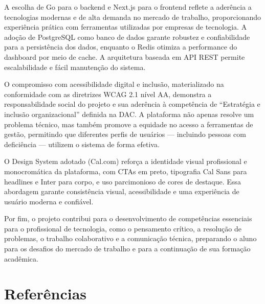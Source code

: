 \documentclass[a4paper,12pt,oneside]{article}
\begin{document}
A escolha de Go para o backend e Next.js para o frontend reflete a aderência a tecnologias modernas e de alta demanda no mercado de trabalho, proporcionando experiência prática com ferramentas utilizadas por empresas de tecnologia. A adoção de PostgreSQL como banco de dados garante robustez e confiabilidade para a persistência dos dados, enquanto o Redis otimiza a performance do dashboard por meio de cache. A arquitetura baseada em API REST permite escalabilidade e fácil manutenção do sistema.

O compromisso com acessibilidade digital e inclusão, materializado na conformidade com as diretrizes WCAG 2.1 nível AA, demonstra a responsabilidade social do projeto e sua aderência à competência de ``Estratégia e inclusão organizacional'' definida na DAC. A plataforma não apenas resolve um problema técnico, mas também promove a equidade no acesso a ferramentas de gestão, permitindo que diferentes perfis de usuários --- incluindo pessoas com deficiência --- utilizem o sistema de forma efetiva.

O Design System adotado (Cal.com) reforça a identidade visual profissional e monocromática da plataforma, com CTAs em preto, tipografia Cal Sans para headlines e Inter para corpo, e uso parcimonioso de cores de destaque. Essa abordagem garante consistência visual, acessibilidade e uma experiência de usuário moderna e confiável.

Por fim, o projeto contribui para o desenvolvimento de competências essenciais para o profissional de tecnologia, como o pensamento crítico, a resolução de problemas, o trabalho colaborativo e a comunicação técnica, preparando o aluno para os desafios do mercado de trabalho e para a continuação de sua formação acadêmica.

\section{Referências}
\end{document}
